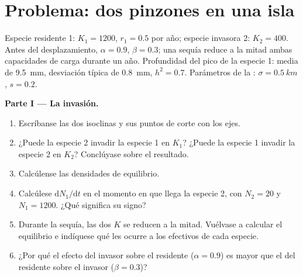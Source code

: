 \section{Problema: dos pinzones en una isla}

\begin{problem}
\label{pb:b2:speciation:1}
Especie residente 1: $K_1 = 1200$, $r_1 = 0.5$ por año; especie invasora
2: $K_2 = 400$. Antes del desplazamiento, $\alpha = 0.9$, $\beta =
0.3$; una sequía reduce a la mitad ambas capacidades de carga durante un
año. Profundidad del pico de la especie 1: media de \qty{9.5}{mm},
desviación típica de
\qty{0.8}{mm}, $h^{2} = 0.7$. Parámetros de la : $\sigma =
\qty{0.5}{km}$, $s = 0.2$.

\medskip
\noindent\textbf{Parte I --- La invasión.}
\begin{enumerate}
  \item Escríbanse las dos isoclinas y sus puntos de corte con los ejes.
  \item ¿Puede la especie 2 invadir la especie 1 en $K_1$? ¿Puede la
        especie 1 invadir la especie 2 en $K_2$? Conclúyase sobre el
        resultado.
  \item Calcúlense las densidades de equilibrio.
  \item Calcúlese $\mathrm{d}N_1/\mathrm{d}t$ en el momento en que llega
        la especie 2, con $N_2 = 20$ y $N_1 = 1200$. ¿Qué significa su
        signo?
  \item Durante la sequía, las dos $K$ se reducen a la mitad. Vuélvase a
        calcular el equilibrio e indíquese qué les ocurre a los efectivos
        de cada especie.
  \item ¿Por qué el efecto del invasor sobre el residente ($\alpha = 0.9$)
        es mayor que el del residente sobre el invasor ($\beta = 0.3$)?
\end{enumerate}


\end{problem}
